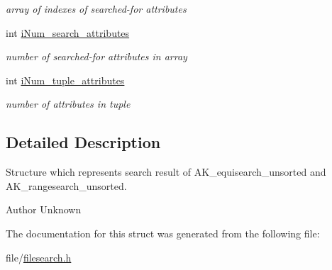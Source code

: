 \begin{DoxyCompactItemize}
\begin{DoxyCompactList}\small\item\em array of indexes of searched-\/for attributes \end{DoxyCompactList}\item 
int \hyperlink{structsearch__result_a5c9f6447daff5cb8aa7183d71eeffb4a}{i\+Num\+\_\+search\+\_\+attributes}\hypertarget{structsearch__result_a5c9f6447daff5cb8aa7183d71eeffb4a}{}\label{structsearch__result_a5c9f6447daff5cb8aa7183d71eeffb4a}

\begin{DoxyCompactList}\small\item\em number of searched-\/for attributes in array \end{DoxyCompactList}\item 
int \hyperlink{structsearch__result_ad5720e57b8309e3922f05dc48cd0dc47}{i\+Num\+\_\+tuple\+\_\+attributes}\hypertarget{structsearch__result_ad5720e57b8309e3922f05dc48cd0dc47}{}\label{structsearch__result_ad5720e57b8309e3922f05dc48cd0dc47}

\begin{DoxyCompactList}\small\item\em number of attributes in tuple \end{DoxyCompactList}\end{DoxyCompactItemize}


\subsection{Detailed Description}
Structure which represents search result of A\+K\+\_\+equisearch\+\_\+unsorted and A\+K\+\_\+rangesearch\+\_\+unsorted. 

\begin{DoxyAuthor}{Author}
Unknown 
\end{DoxyAuthor}


The documentation for this struct was generated from the following file\+:\begin{DoxyCompactItemize}
\item 
file/\hyperlink{filesearch_8h}{filesearch.\+h}\end{DoxyCompactItemize}
